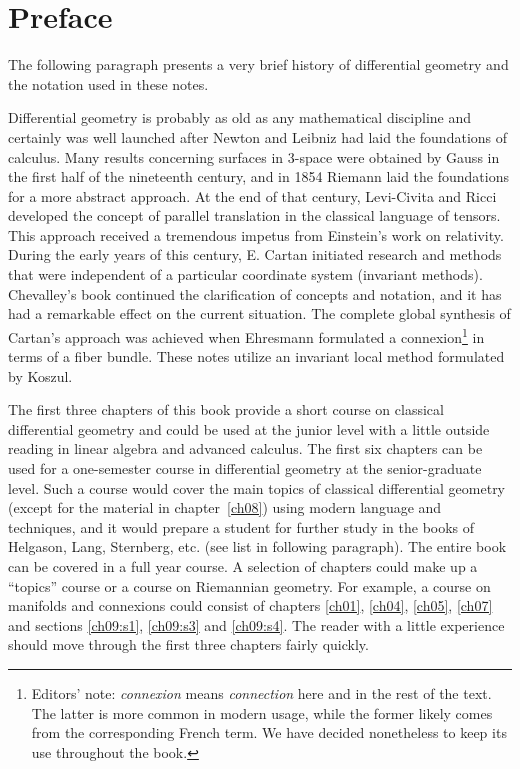 \documentclass[main]{subfiles}
\begin{document}
\chapter*{Preface}

The following paragraph presents a very brief history of differential geometry and the notation used in these notes. 

Differential geometry is probably as old as any mathematical discipline and certainly was well launched after Newton and Leibniz had laid the foundations of calculus. Many results concerning surfaces in 3-space were obtained by Gauss in the first half of the nineteenth century, and in 1854 Riemann laid the foundations for a more abstract approach. At the end of that century, Levi-Civita and Ricci developed the concept of parallel translation in the classical language of tensors. This approach received a tremendous impetus from Einstein's work on relativity. During the early years of this century, E. Cartan initiated research and methods that were independent of a particular coordinate system (invariant methods). Chevalley's book \cite{chevalley1946theory} continued the clarification of concepts and notation, and it has had a remarkable effect on the current situation. The complete global synthesis of Cartan's approach was achieved when Ehresmann formulated a connexion\footnote{Editors' note: \emph{connexion} means \emph{connection} here and in the rest of the text. The latter is more common in modern usage, while the former likely comes from the corresponding French term. We have decided nonetheless to keep its use throughout the book.} in terms of a fiber bundle. These notes utilize an invariant local method formulated by Koszul. %

The first three chapters of this book provide a short course on classical differential geometry and could be used at the junior level with a little outside reading in linear algebra and advanced calculus. The first six chapters can be used for a one-semester course in differential geometry at the senior-graduate level. Such a course would cover the main topics of classical differential geometry (except for the material in chapter~\ref{ch08}) using modern language and techniques, and it would prepare a student for further study in the books of Helgason, Lang, Sternberg, etc. (see list in following paragraph). The entire book can be covered in a full year course. A selection of chapters could make up a ``topics'' course or a course on Riemannian geometry. For example, a course on manifolds and connexions could consist of chapters \ref{ch01}, \ref{ch04}, \ref{ch05}, \ref{ch07} and sections \ref{ch09:s1}, \ref{ch09:s3} and \ref{ch09:s4}. The reader with a little experience should move through the first three chapters fairly quickly.  
\end{document}
